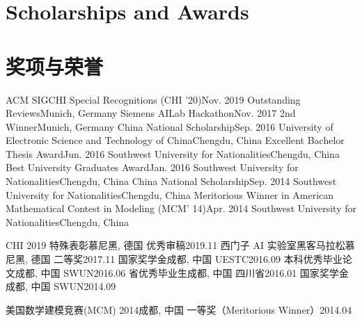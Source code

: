 
 {
\section{\textbf{Scholarships and Awards}}
}{
\section{\textbf{奖项与荣誉}}
}
\resumeSubHeadingListStartNoLabel
{} {
    \small
    \resumeSubheading
        {ACM SIGCHI Special Recognitions (CHI '20)}{Nov. 2019}
        {Outstanding Reviews}{Munich, Germany}
    \resumeSubheading
        {Siemens AILab Hackathon}{Nov. 2017}
        {2nd Winner}{Munich, Germany}
    \resumeSubheading
        {China National Scholarship}{Sep. 2016}
        {University of Electronic Science and Technology of China}{Chengdu, China}
    \resumeSubheading
        {Excellent Bachelor Thesis Award}{Jun. 2016}
        {Southwest University for Nationalities}{Chengdu, China}
    \resumeSubheading
        {Best University Graduates Award}{Jan. 2016}
        {Southwest University for Nationalities}{Chengdu, China}
    \resumeSubheading
        {China National Scholarship}{Sep. 2014}
        {Southwest University for Nationalities}{Chengdu, China}
    \resumeSubheading
        {Meritorious Winner in American Mathematical Contest in Modeling (MCM' 14)}{Apr. 2014}
        {Southwest University for Nationalities}{Chengdu, China}
}{

    \resumeSubHeadingListStart
    \small
    \resumeSubheading
        {CHI 2019 特殊表彰}{慕尼黑, 德国}
        {优秀审稿}{2019.11}
    \resumeSubheading
        {西门子 AI 实验室黑客马拉松}{慕尼黑, 德国}
        {二等奖}{2017.11}
    \resumeSubheading
        {国家奖学金}{成都, 中国}
        {UESTC}{2016.09}
    \resumeSubheading
        {本科优秀毕业论文}{成都, 中国}
        {SWUN}{2016.06}
    \resumeSubheading
        {省优秀毕业生}{成都, 中国}
        {四川省}{2016.01}
    \resumeSubheading
        {国家奖学金}{成都, 中国}
        {SWUN}{2014.09}

    \resumeSubheading
        {美国数学建模竞赛(MCM) 2014}{成都, 中国}
        {一等奖（Meritorious Winner）}{2014.04}
  \resumeSubHeadingListEnd

}
\resumeSubHeadingListEnd